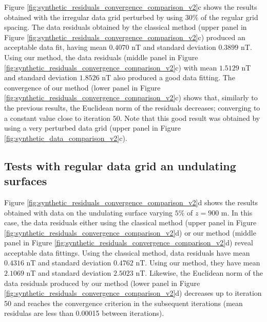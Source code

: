 \documentclass[manuscript]{geophysics}
\begin{document}
Figure \ref{fig:synthetic_residuals_convergence_comparison_v2}c shows the results obtained
with the irregular data grid perturbed by using $30\%$ of the regular grid spacing.
The data residuals 
obtained by the classical method (upper panel in Figure \ref{fig:synthetic_residuals_convergence_comparison_v2}c) produced an acceptable data fit, having mean 
$0.4070$ nT and standard deviation $0.3899$ nT. 
%
%
Using our method, the data residuals (middle panel in Figure 
\ref{fig:synthetic_residuals_convergence_comparison_v2}c) with mean $1.5129$ nT and 
standard deviation $1.8526$ nT also produced a good data fitting.
The convergence of our method (lower panel in Figure 
\ref{fig:synthetic_residuals_convergence_comparison_v2}c) shows that, 
similarly to the previous results, the Euclidean norm of the residuals decreases; converging 
to a constant value close to iteration $50$. Note that this good result was obtained by 
using a very perturbed data grid (upper panel in Figure \ref{fig:synthetic_data_comparison_v2}c).
%

\subsection*{Tests with regular data grid an undulating surfaces}

Figure \ref{fig:synthetic_residuals_convergence_comparison_v2}d shows the results obtained
with data on the undulating surface varying $5\%$ of $z = 900$ m.
In this case, the data residuals either using the classical method 
(upper panel in Figure \ref{fig:synthetic_residuals_convergence_comparison_v2}d) or
our method (middle panel in Figure \ref{fig:synthetic_residuals_convergence_comparison_v2}d) reveal
acceptable data fittings.
Using the classical method, data residuals have mean $0.4316$ nT and standard deviation $0.4762$ nT.
Using our method, they have mean $2.1069$ nT and standard deviation $2.5023$ nT. 
Likewise, the Euclidean norm of the data residuals produced by our method 
(lower panel in Figure \ref{fig:synthetic_residuals_convergence_comparison_v2}d) decreases up to 
iteration 50 and reaches the convergence criterion in the subsequent iterations (mean residulas are less than 
0.00015 between iterations).
\end{document}
